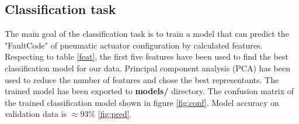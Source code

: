 \documentclass[class=article, crop=false]{standalone}
\begin{document}
\subsection{Classification task}

The main goal of the classification task is to train a model that can
predict the "FaultCode" of pneumatic actuator configuration by
calculated features.
Respecting to table \ref{feat}, the first five features have been used to
find the best classification model for our data.
Principal component analysis (PCA) has been used to reduce the number of
features and chose the best representants.
The trained model has been exported to
\textbf{models/} directory.
The confusion matrix of the trained classification model shown in figure
\ref{fig:conf}. Model accuracy on validation data is $\approx 93 \%$
\ref{fig:pred}.
\end{document}
